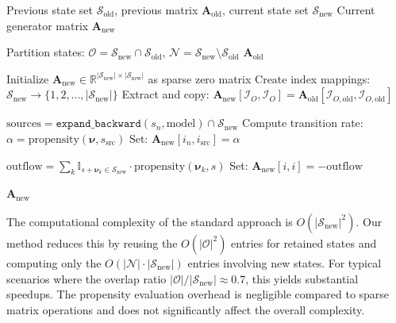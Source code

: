 \documentclass[final,supplement,onefignum,onetabnum]{siamart171218}
\begin{document}
\begin{algorithm}[H]
\caption{Efficient Master Equation Matrix Reconstruction}
\label{alg:matrix_reconstruction}
\begin{algorithmic}[1]
\REQUIRE Previous state set $\mathcal{S}_{\text{old}}$, previous matrix $\mathbf{A}_{\text{old}}$, current state set $\mathcal{S}_{\text{new}}$
\ENSURE Current generator matrix $\mathbf{A}_{\text{new}}$

\STATE Partition states: $\mathcal{O} = \mathcal{S}_{\text{new}} \cap \mathcal{S}_{\text{old}}$, $\mathcal{N} = \mathcal{S}_{\text{new}} \setminus \mathcal{S}_{\text{old}}$
    \RETURN $\mathbf{A}_{\text{old}}$ 
\ENDIF

\STATE Initialize $\mathbf{A}_{\text{new}} \in \mathbb{R}^{|\mathcal{S}_{\text{new}}| \times |\mathcal{S}_{\text{new}}|}$ as sparse zero matrix
\STATE Create index mappings: $\mathcal{S}_{\text{new}} \rightarrow \{1, 2, \ldots, |\mathcal{S}_{\text{new}}|\}$
\STATE Extract and copy: $\mathbf{A}_{\text{new}}[\mathcal{I}_O, \mathcal{I}_O] = \mathbf{A}_{\text{old}}[\mathcal{I}_{O,\text{old}}, \mathcal{I}_{O,\text{old}}]$

    \STATE $\text{sources} = \texttt{expand\_backward}(s_n, \text{model}) \cap \mathcal{S}_{\text{new}}$
        \STATE Compute transition rate: $\alpha = \text{propensity}(\boldsymbol{\nu}, s_{\text{src}})$
        \STATE Set: $\mathbf{A}_{\text{new}}[i_n, i_{\text{src}}] = \alpha$
    \ENDFOR
\ENDFOR

    \STATE $\text{outflow} = \sum_{k} \mathbb{I}_{s + \boldsymbol{\nu}_k \in \mathcal{S}_{\text{new}}} \cdot \text{propensity}(\boldsymbol{\nu}_k, s)$
    \STATE Set: $\mathbf{A}_{\text{new}}[i, i] = -\text{outflow}$
\ENDFOR

\RETURN $\mathbf{A}_{\text{new}}$
\end{algorithmic}
\end{algorithm}

The computational complexity of the standard approach is $O(|\mathcal{S}_{\text{new}}|^2)$. Our method reduces this by reusing the $O(|\mathcal{O}|^2)$ entries for retained states and computing only the $O(|\mathcal{N}| \cdot |\mathcal{S}_{\text{new}}|)$ entries involving new states. For typical scenarios where the overlap ratio $|\mathcal{O}|/|\mathcal{S}_{\text{new}}| \approx 0.7$, this yields substantial speedups. The propensity evaluation overhead is negligible compared to sparse matrix operations and does not significantly affect the overall complexity.
\end{document}

